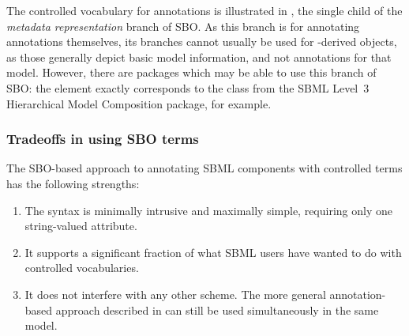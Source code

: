 \begin{blockChanged}
The controlled vocabulary for annotations is illustrated in , the single child of the \emph{metadata representation} branch of SBO.  As this branch is for annotating annotations themselves, its branches cannot usually be used for \SBase-derived objects, as those generally depict basic model information, and not annotations for that model.  However, there are packages which may be able to use this branch of SBO:  the  element exactly corresponds to the  class from the SBML Level~3 Hierarchical Model Composition package, for example.

%
\end{blockChanged}


\subsubsection{Tradeoffs in using SBO terms}

The SBO-based approach to annotating SBML components with
controlled terms has the following strengths:
\begin{enumerate}

\item The syntax is minimally intrusive and maximally simple,
  requiring only one string-valued attribute.

\item It supports a significant fraction of what SBML users have wanted
  to do with controlled vocabularies.

\item It does not interfere with any other scheme.  The more
  general annotation-based approach described in
   can still be used
  simultaneously in the same model.

\end{enumerate}

